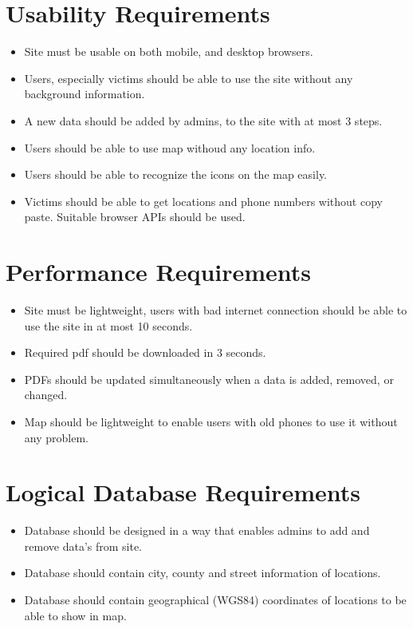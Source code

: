 \section{Usability Requirements}
\begin{itemize}
    \item Site must be usable on both mobile, and desktop browsers.
    \item Users, especially victims should be able to use the site without any background information.
    \item A new data should be added by admins, to the site with at most 3 steps.
    \item Users should be able to use map withoud any location info.
    \item Users should be able to recognize the icons on the map easily.
    \item Victims should be able to get locations and phone numbers without copy paste. Suitable browser APIs should be used.
\end{itemize}

\section{Performance Requirements}
\begin{itemize}
    \item Site must be lightweight, users with bad internet connection should be able to use the site in at most 10 seconds.
    \item Required pdf should be downloaded in 3 seconds.
    \item PDFs should be updated simultaneously when a data is added, removed, or changed.
    \item Map should be lightweight to enable users with old phones to use it without any problem.
\end{itemize}

\section{Logical Database Requirements}
\begin{itemize}
    \item Database should be designed in a way that enables admins to add and remove data's from site.
    \item Database should contain city, county and street information of locations.
    \item Database should contain geographical (WGS84) coordinates of locations to be able to show in map.
\end{itemize}

